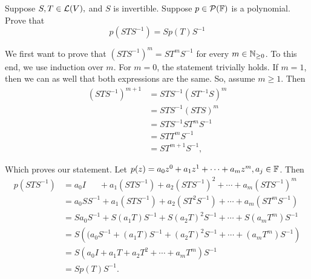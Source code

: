\begin{xrcs}
  Suppose $S,T \in \mathcal{L} (V), $ and $S$ is invertible. Suppose $p \in \mathcal{P}(\mathbb{F})$ is a polynomial. Prove that
  \begin{equation}
    p(STS^{-1}) = S p(T) S ^{-1}
  \end{equation}

  \begin{xprf}
    We first want to prove that $(STS^{-1})^m = ST^m S^{-1}$ for every $m \in \mathbb{N}_{\geq 0}$. To this end, we use induction over $m$. For $m=0$, the statement trivially holds. If $m=1$, then we can as well that both expressions are the same. So, assume $m \geq 1$. Then
    \begin{equation}
      \begin{aligned}
        (STS^{-1})^{m+1} &= STS^{-1} (ST^{-1} S) ^m \\
          &= STS^{-1} (ST S) ^m \\
          &= STS^{-1} ST^m S^{-1} \\
          &= S T T^{m} S^{-1} \\
          &= S T^{m+1} S^{-1},
      \end{aligned}
    \end{equation}

    Which proves our statement. Let $p(z)=a_0 z^0 + a_1 z^1 + \cdots + a_m z^m, a_j \in \mathbb{F}$. Then
    \begin{equation}
      \begin{aligned}
        p(STS^{-1}) &= a_0 I \phantom{S^{-1}} + a_1(STS^{-1}) + a_2 (STS^{-1})^2 + \cdots + a_m (STS^{-1})^m \\
                    &= a_0 S S^{-1} + a_1(STS^{-1}) + a_2 (ST^2S^{-1}) + \cdots + a_m (ST^mS^{-1}) \\
                    &= S a_0  S^{-1} + S(a_1T)S^{-1} + S(a_2 T)^2S^{-1} + \cdots + S(a_mT^m)S^{-1} \\
                    &= S \left( (a_0  S^{-1} + (a_1T)S^{-1} + (a_2 T)^2S^{-1} + \cdots + (a_mT^m)S^{-1}\right) \\
                    &= S \left( a_0 I  + a_1T + a_2 T^2 + \cdots + a_mT^m \right)S^{-1} \\
                    &= S p(T) S^{-1}.
      \end{aligned}
    \end{equation}
  \end{xprf}
\end{xrcs}